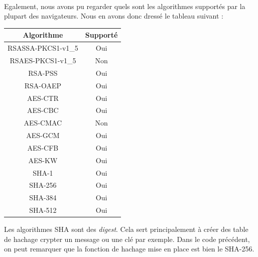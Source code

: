 \documentclass[a4paper,12pt]{report}
\begin{document}
	\paragraph*{}
	Egalement, nous avons pu regarder quels sont les algorithmes supportés par la plupart des navigateurs. Nous en avons donc dressé le tableau suivant : 
	\begin{center}
	\begin{tabular}[h]{|*{2}{c|}}
  		\hline
  		Algorithme & Supporté\\
  		\hline
  		RSASSA-PKCS1-v1\_5 & Oui\\
  		\hline
  		RSAES-PKCS1-v1\_5 & Non\\
  		\hline
  		RSA-PSS & Oui\\
  		\hline
  		RSA-OAEP & Oui\\
  		\hline
  		AES-CTR & Oui\\
  		\hline
  		AES-CBC & Oui\\
  		\hline
  		AES-CMAC & Non\\
  		\hline
  		AES-GCM & Oui\\
  		\hline
  		AES-CFB & Oui\\
  		\hline
  		AES-KW & Oui\\
  		\hline
  		SHA-1 & Oui\\
  		\hline
  		SHA-256 & Oui\\
  		\hline
  		SHA-384 & Oui\\
  		\hline
  		SHA-512 & Oui\\
  		\hline
	\end{tabular}
	\end{center}
	Les algorithmes SHA sont des \textit{digest}. Cela sert principalement à créer des table de hachage crypter un message ou une clé par exemple. Dans le code précédent, on peut remarquer que la fonction de hachage mise en place est bien le SHA-256.
\end{document}
